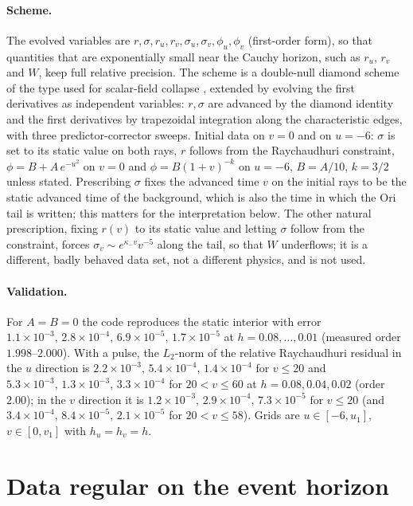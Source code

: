 \documentclass[11pt]{article}
\begin{document}
\paragraph{Scheme.} The evolved variables are $r,\sigma,r_u,r_v,\sigma_u,\sigma_v,\phi_u,\phi_v$ (first-order form), so that quantities that are exponentially small near the Cauchy horizon, such as $r_u$, $r_v$ and $W$, keep full relative precision. The scheme is a double-null diamond scheme of the type used for scalar-field collapse \citep{GundlachPricePullin1994}, extended by evolving the first derivatives as independent variables: $r,\sigma$ are advanced by the diamond identity and the first derivatives by trapezoidal integration along the characteristic edges, with three predictor-corrector sweeps. Initial data on $v=0$ and on $u=-6$: $\sigma$ is set to its static value on both rays, $r$ follows from the Raychaudhuri constraint, $\phi=B+A\,e^{-u^2}$ on $v=0$ and $\phi=B(1+v)^{-k}$ on $u=-6$, $B=A/10$, $k=3/2$ unless stated. Prescribing $\sigma$ fixes the advanced time $v$ on the initial rays to be the static advanced time of the background, which is also the time in which the Ori tail is written; this matters for the interpretation below. The other natural prescription, fixing $r(v)$ to its static value and letting $\sigma$ follow from the constraint, forces $\sigma_v\sim e^{\kappa_-v}v^{-5}$ along the tail, so that $W$ underflows; it is a different, badly behaved data set, not a different physics, and is not used.

\paragraph{Validation.} For $A=B=0$ the code reproduces the static interior with error $1.1\times10^{-3},\,2.8\times10^{-4},\,6.9\times10^{-5},\,1.7\times10^{-5}$ at $h=0.08,\dots,0.01$ (measured order $1.998$--$2.000$). With a pulse, the $L_2$-norm of the relative Raychaudhuri residual in the $u$ direction is $2.2\times10^{-3},\,5.4\times10^{-4},\,1.4\times10^{-4}$ for $v\le20$ and $5.3\times10^{-3},\,1.3\times10^{-3},\,3.3\times10^{-4}$ for $20<v\le60$ at $h=0.08,0.04,0.02$ (order $2.00$); in the $v$ direction it is $1.2\times10^{-3},\,2.9\times10^{-4},\,7.3\times10^{-5}$ for $v\le20$ (and $3.4\times10^{-4},\,8.4\times10^{-5},\,2.1\times10^{-5}$ for $20<v\le58$). Grids are $u\in[-6,u_1]$, $v\in[0,v_1]$ with $h_u=h_v=h$.


\section{Data regular on the event horizon}
\label{sec:ehdata}
\end{document}
